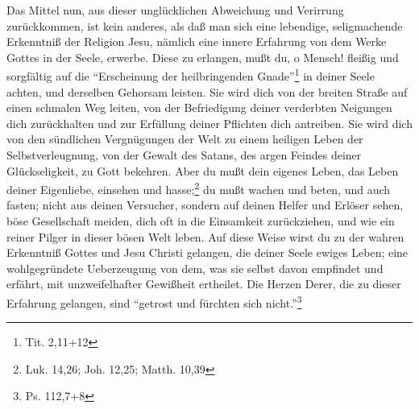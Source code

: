 Das Mittel nun, aus dieser unglücklichen Abweichung und Verirrung zurückkommen,
ist kein anderes, als daß man sich eine lebendige, seligmachende Erkenntniß der
Religion Jesu, nämlich eine innere Erfahrung von dem Werke Gottes in der Seele,
erwerbe. Diese zu erlangen, mußt du, o Mensch! fleißig und sorgfältig auf die
"`Erscheinung der heilbringenden Gnade"'\footnote{Tit. 2,11+12} in deiner Seele
achten, und derselben Gehorsam leisten. Sie wird dich von der breiten Straße auf
einen schmalen Weg leiten, von der Befriedigung deiner verderbten Neigungen dich
zurückhalten und zur Erfüllung deiner Pflichten dich antreiben. Sie wird dich
von den sündlichen Vergnügungen der Welt zu einem heiligen Leben der
Selbstverleugnung, von der Gewalt des Satans, des argen Feindes deiner
Glückseligkeit, zu Gott bekehren. Aber du mußt dein eigenes Leben, das Leben
deiner Eigenliebe, einsehen und hasse;\footnote{Luk. 14,26; Joh. 12,25; Matth.
10,39} du mußt wachen und beten, und auch fasten; nicht aus deinen Versucher,
sondern auf deinen Helfer und Erlöser sehen, böse Gesellschaft meiden, dich oft
in die Einsamkeit zurückziehen, und wie ein reiner Pilger in dieser bösen Welt
leben. Auf diese Weise wirst du zu der wahren Erkenntniß Gottes und Jesu Christi
gelangen, die deiner Seele ewiges Leben; eine wohlgegründete Ueberzeugung von
dem, was sie selbst davon empfindet und erfährt, mit unzweifelhafter Gewißheit
ertheilet. Die Herzen Derer, die zu dieser Erfahrung gelangen, sind "`getrost
und fürchten sich nicht."'\footnote{Ps. 112,7+8}

